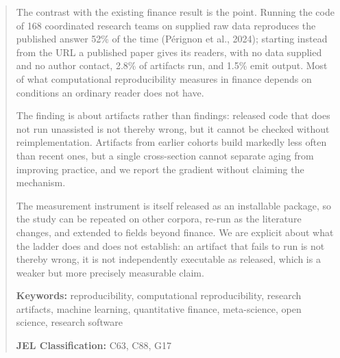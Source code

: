 \documentclass[12pt,a4paper]{article}
\begin{document}
\begin{abstract}
The contrast with the existing finance result is the point. Running the code of
168 coordinated research teams on supplied raw data reproduces the published
answer 52\% of the time (Pérignon et al., 2024); starting instead from the URL a
published paper gives its readers, with no data supplied and no author contact,
2.8\% of artifacts run, and 1.5\% emit output. Most of what computational reproducibility measures
in finance depends on conditions an ordinary reader does not have.

The finding is about artifacts rather than findings: released code that does not
run unassisted is not thereby wrong, but it cannot be checked without
reimplementation. Artifacts from earlier cohorts build markedly less often than
recent ones, but a single cross-section cannot separate aging from improving
practice, and we report the gradient without claiming the mechanism.

The measurement instrument is itself released as an installable package, so the
study can be repeated on other corpora, re-run as the literature changes, and
extended to fields beyond finance. We are explicit about what the ladder does and
does not establish: an artifact that fails to run is not thereby wrong, it is
not independently executable as released, which is a weaker but more precisely
measurable claim.

\medskip
\noindent\textbf{Keywords:} reproducibility, computational reproducibility,
research artifacts, machine learning, quantitative finance, meta-science,
open science, research software

\medskip
\noindent\textbf{JEL Classification:} C63, C88, G17
\end{abstract}

\newpage
\tableofcontents
\newpage









\end{document}
